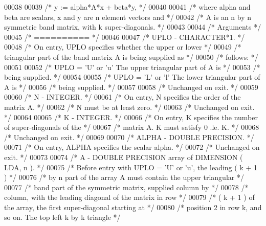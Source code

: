 \begin{DoxyCode}
00038 
00039 \textcolor{comment}{/*     y := alpha*A*x + beta*y, */}
00040 
00041 \textcolor{comment}{/*  where alpha and beta are scalars, x and y are n element vectors and */}
00042 \textcolor{comment}{/*  A is an n by n symmetric band matrix, with k super-diagonals. */}
00043 
00044 \textcolor{comment}{/*  Arguments */}
00045 \textcolor{comment}{/*  ========== */}
00046 
00047 \textcolor{comment}{/*  UPLO   - CHARACTER*1. */}
00048 \textcolor{comment}{/*           On entry, UPLO specifies whether the upper or lower */}
00049 \textcolor{comment}{/*           triangular part of the band matrix A is being supplied as */}
00050 \textcolor{comment}{/*           follows: */}
00051 
00052 \textcolor{comment}{/*              UPLO = 'U' or 'u'   The upper triangular part of A is */}
00053 \textcolor{comment}{/*                                  being supplied. */}
00054 
00055 \textcolor{comment}{/*              UPLO = 'L' or 'l'   The lower triangular part of A is */}
00056 \textcolor{comment}{/*                                  being supplied. */}
00057 
00058 \textcolor{comment}{/*           Unchanged on exit. */}
00059 
00060 \textcolor{comment}{/*  N      - INTEGER. */}
00061 \textcolor{comment}{/*           On entry, N specifies the order of the matrix A. */}
00062 \textcolor{comment}{/*           N must be at least zero. */}
00063 \textcolor{comment}{/*           Unchanged on exit. */}
00064 
00065 \textcolor{comment}{/*  K      - INTEGER. */}
00066 \textcolor{comment}{/*           On entry, K specifies the number of super-diagonals of the */}
00067 \textcolor{comment}{/*           matrix A. K must satisfy  0 .le. K. */}
00068 \textcolor{comment}{/*           Unchanged on exit. */}
00069 
00070 \textcolor{comment}{/*  ALPHA  - DOUBLE PRECISION. */}
00071 \textcolor{comment}{/*           On entry, ALPHA specifies the scalar alpha. */}
00072 \textcolor{comment}{/*           Unchanged on exit. */}
00073 
00074 \textcolor{comment}{/*  A      - DOUBLE PRECISION array of DIMENSION ( LDA, n ). */}
00075 \textcolor{comment}{/*           Before entry with UPLO = 'U' or 'u', the leading ( k + 1 ) */}
00076 \textcolor{comment}{/*           by n part of the array A must contain the upper triangular */}
00077 \textcolor{comment}{/*           band part of the symmetric matrix, supplied column by */}
00078 \textcolor{comment}{/*           column, with the leading diagonal of the matrix in row */}
00079 \textcolor{comment}{/*           ( k + 1 ) of the array, the first super-diagonal starting at */}
00080 \textcolor{comment}{/*           position 2 in row k, and so on. The top left k by k triangle */}

\end{DoxyCode}
